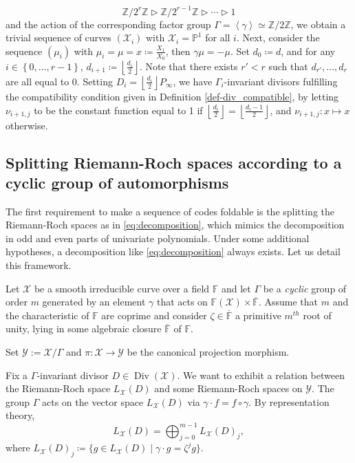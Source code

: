 \documentclass[10pt,a4paper]{article}
\newcommand\F{\mathbb{F}}
\newcommand\PP{\mathbb{P}}
\newcommand\Z{\mathbb{Z}}
\newcommand\floor[1]{\left\lfloor #1 \right\rfloor}
\newcommand\gen[1]{\left\langle #1 \right\rangle}
\renewcommand{\bar}{\overline}
\DeclareMathOperator{\Div}{Div}
\newcommand{\set}[1]{\left\{#1\right\}}
\newcommand{\range}[1]{\set{0,\dots,#1-1}}
\newcommand\calY{\mathcal{Y}}
\newcommand\calX{\mathcal{X}}
\newcommand\mydef{\coloneqq}
\theoremstyle{plain}
\theoremstyle{plain}
\theoremstyle{definition}
\theoremstyle{remark}
\theoremstyle{plain}
\begin{document}
\begin{equation}
	\Z / 2^{r} \Z \vartriangleright \Z / 2^{r-1} \Z  \vartriangleright \cdots \vartriangleright 1
\end{equation}
and the action of the corresponding factor group $\Gamma = \gen{\gamma} \simeq \Z / 2 \Z$, we obtain a trivial sequence of curves $(\calX_i)$ with $\calX_i = \PP^1$ for all $i$. Next, consider the sequence $(\mu_i)$ with $\mu_i = \mu = x \mydef \frac{X_1}{X_0}$, then $\gamma \mu = - \mu$. Set $d_0 \mydef d$, and for any $i \in \range{r}$, $d_{i+1} \mydef \floor{\frac{d_i}{2}}$. Note that there exists $r' < r$ such that $d_{r'}, \dots, d_{r}$ are all equal to 0. 
Setting $D_i = \floor{\frac{d_i}{2}}P_\infty$, we have $\Gamma_i$-invariant divisors fulfilling the compatibility condition given in Definition \ref{def-div_compatible}, by letting $\nu_{i+1, j}$ to be the constant function equal to 1 if $\floor{\frac{d_i}{2}} = \floor{\frac{d_i-1}{2}}$, and $\nu_{i+1, j} : x \mapsto x$ otherwise.


\subsection{Splitting Riemann-Roch spaces according to a cyclic group of automorphisms}

The first requirement to make a sequence of codes foldable is the splitting the Riemann-Roch spaces as in \eqref{eq:decomposition}, which mimics the decomposition in odd and even parts of univariate polynomials.  Under some additional hypotheses, a decomposition like \eqref{eq:decomposition} always exists. Let us detail this framework.

\medskip

Let $\calX$ be a smooth irreducible curve over a field $\F$ and let $\Gamma$ be a \textit{cyclic} group of order $m$ generated by an element $\gamma$ that acts on $\F(\calX) \times \overline{\F}$. Assume that $m$ and the characteristic of $\F$ are coprime and consider $\zeta \in \bar{\F}$ a primitive $m^{th}$ root of unity, lying in some algebraic closure $\bar{\F}$ of $\F$. 

Set $\calY := \calX/\Gamma$ and $\pi : \calX \rightarrow \calY$ be the canonical projection morphism.

Fix a $\Gamma$-invariant divisor $D \in \Div(\calX)$. We want to exhibit a relation between the Riemann-Roch space $L_\calX(D)$ and some Riemann-Roch spaces on $\calY$. The group $\Gamma$ acts on the vector space $L_\calX(D)$ via $\gamma \cdot f = f \circ \gamma$. By representation theory,
\[L_\calX(D) = \bigoplus_{j=0}^{m-1} L_\calX(D)_j,\]
where $L_\calX(D)_j \mydef \{ g \in L_\calX(D) \mid \gamma \cdot g = \zeta^j g \}$.
\end{document}
